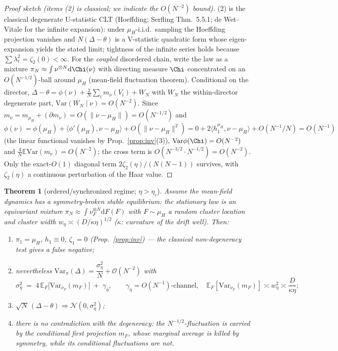 \documentclass[11pt]{article}
\newtheorem{theorem}{Theorem}
\theoremstyle{definition}
\newcommand{\E}{\mathbb{E}}
\newcommand{\Var}{\mathrm{Var}}
\newcommand{\dd}{\mathrm{d}}
\begin{document}
\begin{proof}[Proof sketch (items (2) is classical; we indicate the $O(N^{-2})$ bound)]
(2) is the classical degenerate U-statistic CLT (Hoeffding; Serfling Thm.~5.5.1;
de Wet--Vitale for the infinite expansion): under $\mu_H$-i.i.d.\ sampling the
Hoeffding projection vanishes and $N(\Delta-\theta)$ is a V-statistic quadratic form
whose eigen-expansion yields the stated limit; tightness of the infinite series holds
because $\sum\lambda_\ell^2=\zeta_2(0)<\infty$. For the \emph{coupled} disordered
chain, write the law as a mixture $\pi_N\approx\int\nu^{\otimes N}\dd\Chi(\nu)$ with
directing measure $\Chi$ concentrated on an $O(N^{-1/2})$-ball around $\mu_H$
(mean-field fluctuation theorem). Conditional on the director, $\Delta-\theta=
\phi(\nu)+\frac2N\sum_i m_\nu(V_i)+W_N$ with $W_N$ the within-director degenerate
part, $\Var(W_N\mid\nu)=O(N^{-2})$. Since $m_\nu=m_{\mu_H}+(\partial m_\nu)=
O(\|\nu-\mu_H\|)=O(N^{-1/2})$ and
$\phi(\nu)=\phi(\mu_H)+\langle\phi'(\mu_H),\nu-\mu_H\rangle+O(\|\nu-\mu_H\|^2)
=0+2\langle h_1^{\mu_H},\nu-\mu_H\rangle+O(N^{-1}/N)=O(N^{-1})$
(the linear functional vanishes by Prop.~\ref{prop:inv}(3)),
$\Var\phi(\Chi)=O(N^{-2})$ and $\frac4N\E\Var(m_\nu)=O(N^{-2})$; the cross term is
$O(N^{-3/2}\cdot N^{-1/2})=O(N^{-2})$. Only the exact-$O(1)$ diagonal term
$2\zeta_2(\eta)/(N(N-1))$ survives, with $\zeta_2(\eta)$ a continuous perturbation of
the Haar value.
\end{proof}

\begin{theorem}[ordered/synchronized regime; $\eta>\eta_c$]
\label{thm:ord}
Assume the mean-field dynamics has a symmetry-broken stable equilibrium: the
stationary law is an equivariant mixture $\pi_N\approx\int\nu_F^{\otimes N}\dd F(F)$
with $F\sim\mu_H$ a random cluster location and cluster width
$w_\eta\asymp(D/\kappa\eta)^{1/2}$ ($\kappa$: curvature of the drift well). Then:
\begin{enumerate}
\item $\pi_1=\mu_H$, $h_1\equiv0$, $\zeta_1=0$ (Prop.~\ref{prop:inv}) --- the classical
non-degeneracy test gives a \emph{false negative};
\item nevertheless
$\Var_\pi(\Delta)=\dfrac{\sigma_\eta^2}{N}+\mathcal O(N^{-2})$ with
\[
\sigma_\eta^2 \;=\; 4\,\E_F\bigl[\Var_{\nu_F}(m_F)\bigr] \;+\; \gamma_\eta,
\qquad \gamma_\eta=O(N^{-1})\text{-channel},\quad
\E_F[\Var_{\nu_F}(m_F)]\asymp w_\eta^2\asymp \frac{D}{\kappa\eta};
\]
\item $\sqrt N\,(\Delta-\theta)\Rightarrow\mathcal N(0,\sigma_\eta^2)$;
\item there is no contradiction with the degeneracy: the $N^{-1/2}$-fluctuation is
carried by the \emph{conditional} first projection $m_F$, whose \emph{marginal}
average is killed by symmetry, while its conditional fluctuations are not.
\end{enumerate}
\end{theorem}
\end{document}
